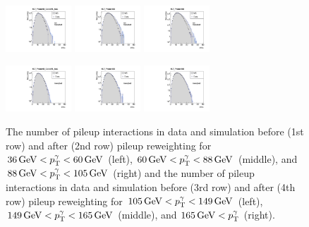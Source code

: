 \begin{figure}[ht]
    \includegraphics[width=0.22\textwidth]{figures/resolution/eventSelection/NVtxComparisonWoWeights4.pdf}
    \includegraphics[width=0.22\textwidth]{figures/resolution/eventSelection/NVtxComparisonWoWeights5.pdf}
    \includegraphics[width=0.22\textwidth]{figures/resolution/eventSelection/NVtxComparisonWoWeights6.pdf}

    \includegraphics[width=0.22\textwidth]{figures/resolution/eventSelection/NVtxComparison4.pdf}
    \includegraphics[width=0.22\textwidth]{figures/resolution/eventSelection/NVtxComparison5.pdf}
    \includegraphics[width=0.22\textwidth]{figures/resolution/eventSelection/NVtxComparison6.pdf}
   \caption{The number of pileup interactions in data and simulation before (1st row) and after (2nd row) pileup reweighting for $36\,\text{Ge}\kern-0.06667em\text{V} < p_{\text{T}}^{\gamma} < 60\,\text{Ge}\kern-0.06667em\text{V}$ (left), $60\,\text{Ge}\kern-0.06667em\text{V} < p_{\text{T}}^{\gamma} < 88\,\text{Ge}\kern-0.06667em\text{V}$ (middle), 
            and $88\,\text{Ge}\kern-0.06667em\text{V} < p_{\text{T}}^{\gamma} < 105\,\text{Ge}\kern-0.06667em\text{V}$ (right) and the number of pileup interactions in data and simulation before (3rd row) and after (4th row) pileup reweighting for $105\,\text{Ge}\kern-0.06667em\text{V} < p_{\text{T}}^{\gamma} < 149\,\text{Ge}\kern-0.06667em\text{V}$ (left), 
            $149\,\text{Ge}\kern-0.06667em\text{V} < p_{\text{T}}^{\gamma} < 165\,\text{Ge}\kern-0.06667em\text{V}$ (middle), and $165\,\text{Ge}\kern-0.06667em\text{V} < p_{\text{T}}^{\gamma}$ (right).}
  \label{res:fig:PUreweighting}
\end{figure}

